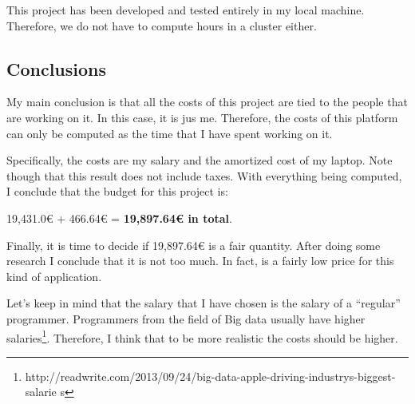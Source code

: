 This project has been developed and tested entirely in my local machine.
Therefore, we do not have to compute hours in a cluster either.

\subsection{Conclusions}

My main conclusion is that all the costs of this project are tied to the people
that are working on it. In this case, it is jus me. Therefore, the costs of
this platform can only be computed as the time that I have spent working on it.

Specifically, the costs are my salary and the amortized cost of my laptop. Note
though that this result does not include taxes. With everything being computed,
I conclude that the budget for this project is:

\begin{center}
  19,431.0\euro{} + 466.64\euro{} = {\bf 19,897.64\euro{} in total}.
\end{center}

Finally, it is time to decide if 19,897.64\euro{} is a fair quantity. After
doing some research I conclude that it is not too much. In fact, is a fairly
low price for this kind of application.

Let's keep in mind that the salary that I have chosen is the salary of a
``regular'' programmer. Programmers from the field of Big data usually have
higher
salaries\footnote{
http://readwrite.com/2013/09/24/big-data-apple-driving-industrys-biggest-salarie
s}. Therefore, I think that to be more realistic the costs should be higher.